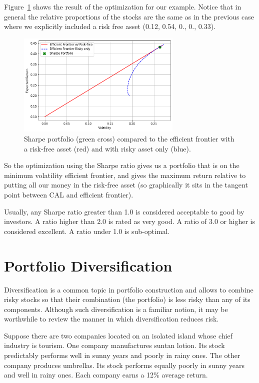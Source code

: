 Figure~\ref{fig:sharpe_ratio} shows the result of the optimization for our example. Notice that in general the relative proportions of the stocks are the same as in the previous case where we explicitly included a risk free asset (0.12, 0.54, 0., 0., 0.33).

\begin{figure}[htb]
	\centering
	\includegraphics[width=0.7\textwidth]{figures/sharpe_ratio.png}
	\caption{Sharpe portfolio (green cross) compared to the efficient frontier with a risk-free asset (red) and with risky asset only (blue).}
	\label{fig:sharpe_ratio}
\end{figure}

So the optimization using the Sharpe ratio gives us a portfolio that is on the minimum volatility efficient frontier, and gives the maximum return relative to putting all our money in the risk-free asset (so graphically it sits in the tangent point between CAL and efficient frontier).

Usually, any Sharpe ratio greater than 1.0 is considered acceptable to good by investors. A ratio higher than 2.0 is rated as very good. A ratio of 3.0 or higher is considered excellent. A ratio under 1.0 is sub-optimal.

\section{Portfolio Diversification}

Diversification is a common topic in portfolio construction and allows to combine risky stocks so that their combination (the portfolio) is less risky than any of its components. Although such diversification is a familiar notion, it may be worthwhile to review the manner in which diversification reduces risk.

Suppose there are two companies located on an isolated island whose chief industry is tourism. One company manufactures suntan lotion. Its stock predictably performs well in sunny years and poorly in rainy ones. The other company produces umbrellas. Its stock performs equally poorly in sunny years and well in rainy ones. Each company earns a 12\% average return.

